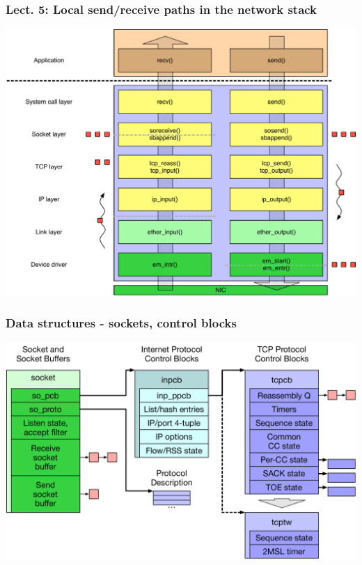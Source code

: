 \begin{frame}
  \frametitle{Lect. 5: Local send/receive paths in the network stack}
  \begin{center}
    \includegraphics[scale=0.4]{../../figures/network-in-out.pdf}
  \end{center}
\end{frame}

\begin{frame}
  \frametitle{Data structures - sockets, control blocks}

  \begin{center}
    \includegraphics[width=\textwidth]{../../figures/tcp-structures.pdf}
  \end{center}
\end{frame}

